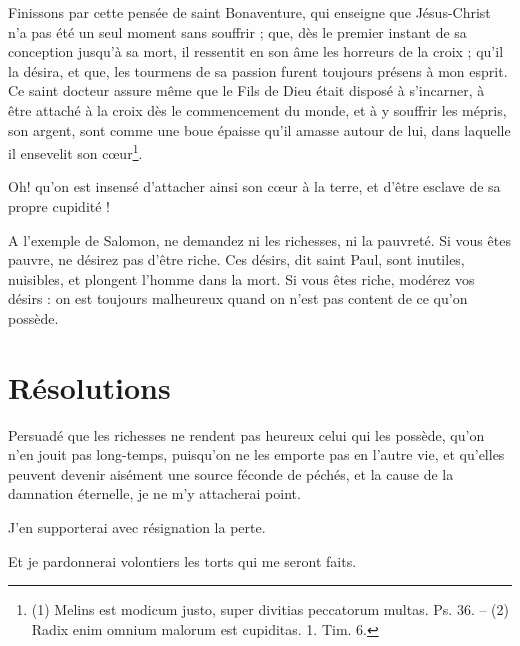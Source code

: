 \documentclass[instructions.tex]{subfiles}
\begin{document}
Finissons par cette pensée de saint Bonaventure, qui enseigne que Jésus-Christ n’a pas été un seul moment sans souffrir ; que, dès le premier instant de sa conception jusqu’à sa mort, il ressentit en son âme les horreurs de la croix ; qu’il la désira, et que, les tourmens de sa passion furent toujours présens à mon esprit. Ce saint docteur assure même que le Fils de Dieu était disposé à s’incarner, à être attaché à la croix dès le commencement du monde, et à y souffrir les mépris, son argent, sont comme une boue épaisse qu’il amasse autour de lui, dans laquelle il ensevelit son cœur\footnote{(1) Melins est modicum justo, super divitias peccatorum multas. Ps. 36. -- (2) Radix enim omnium malorum est cupiditas. 1. Tim. 6.}.
 
Oh! qu’on est insensé d’attacher ainsi son cœur à la terre, et d’être esclave de sa propre cupidité !
 
A l’exemple de Salomon, ne demandez ni les richesses, ni la pauvreté. Si vous êtes pauvre, ne désirez pas d’être riche. Ces désirs, dit saint Paul, sont inutiles, nuisibles, et plongent l’homme dans la mort. Si vous êtes riche, modérez vos désirs : on est toujours malheureux quand on n’est pas content de ce qu’on possède.
 
\section{Résolutions}
 
\primo Persuadé que les richesses ne rendent pas heureux celui qui les possède, qu’on n’en jouit pas long-temps, puisqu’on ne les emporte pas en l’autre vie, et qu’elles peuvent devenir aisément une source féconde de péchés, et la cause de la damnation éternelle, je ne m’y attacherai point.

\secundo J’en supporterai avec résignation la perte.

\tertio Et je pardonnerai volontiers les torts qui me seront faits.

 
\end{document}
